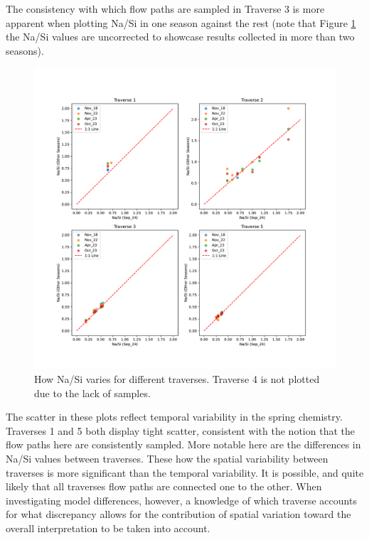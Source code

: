 \bsk

The consistency with which flow paths are sampled in Traverse 3 is more apparent when plotting Na/Si in one season against the rest (note that Figure \ref{fig:spatial_changes_spring8} the Na/Si values are uncorrected to showcase results collected in more than two seasons). 

\begin{figure}[h]
    \centering
    \includegraphics[width=\textwidth]{Na_Si_Seasons.pdf}
    \caption{How Na/Si varies for different traverses. Traverse 4 is not plotted due to the lack of samples.}
    \label{fig:spatial_changes_spring8}
\end{figure}
\FloatBarrier

The scatter in these plots reflect temporal variability in the spring chemistry. Traverses 1 and 5 both display tight scatter, consistent with the notion that the flow paths here are consistently sampled. More notable here are the differences in Na/Si values between traverses. These how the spatial variability between traverses is more significant than the temporal variability. It is possible, and quite likely that all traverses flow paths are connected one to the other. When investigating model differences, however, a knowledge of which traverse accounts for what discrepancy allows for the contribution of spatial variation toward the overall interpretation to be taken into account.









